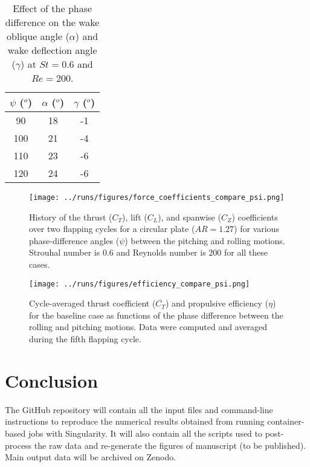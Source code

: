 \begin{table}
  \centering
  \begin{tabular}{ccc}
    \hline\hline
    $\psi$ ($^o$) & $\alpha$ ($^o$) & $\gamma$ ($^o$) \\
    \hline
    90 & 18 & -1 \\
    100 & 21 & -4 \\
    110 & 23 & -6 \\
    120 & 24 & -6 \\
    \hline\hline
  \end{tabular}
  \caption{Effect of the phase difference on the wake oblique angle ($\alpha$) and wake deflection angle ($\gamma$) at $St = 0.6$ and $Re = 200$.}
  \label{tab:phase_angles}
\end{table}

\begin{figure}
  \centering
  \texttt{[image: ../runs/figures/force\_coefficients\_compare\_psi.png]}
  \caption{History of the thrust ($C_T$), lift ($C_L$), and spanwise ($C_Z$) coefficients over two flapping cycles for a circular plate ($AR = 1.27$) for various phase-difference angles ($\psi$) between the pitching and rolling motions. Strouhal number is $0.6$ and Reynolds number is $200$ for all these cases.}
  \label{fig:phase_force_coefficients}
\end{figure}

\begin{figure}
  \centering
  \texttt{[image: ../runs/figures/efficiency\_compare\_psi.png]}
  \caption{Cycle-averaged thrust coefficient ($\overline{C_T}$) and propulsive efficiency ($\eta$) for the baseline case as functions of the phase difference between the rolling and pitching motions. Data were computed and averaged during the fifth flapping cycle.}
  \label{fig:phase_efficiency}
\end{figure}

\section{Conclusion}

The GitHub repository will contain all the input files and command-line instructions to reproduce the numerical results obtained from running container-based jobs with Singularity.
It will also contain all the scripts used to post-process the raw data and re-generate the figures of manuscript (to be published).
Main output data will be archived on Zenodo.
